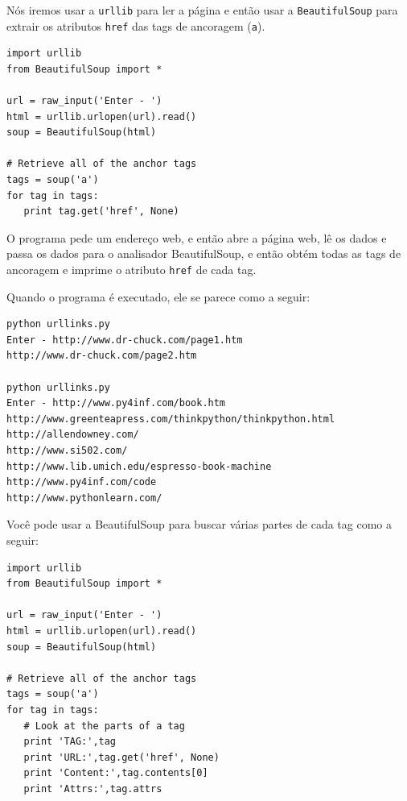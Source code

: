 Nós iremos usar a {\tt urllib} para ler a página e então usar a
{\tt BeautifulSoup} para extrair os atributos {\tt href} das tags de ancoragem
({\tt a}).

\beforeverb
\begin{verbatim}
import urllib
from BeautifulSoup import *

url = raw_input('Enter - ')
html = urllib.urlopen(url).read()
soup = BeautifulSoup(html)

# Retrieve all of the anchor tags
tags = soup('a')
for tag in tags:
   print tag.get('href', None)
\end{verbatim}
\afterverb

O programa pede um endereço web, e então abre a página web, lê os dados e
passa os dados para o analisador BeautifulSoup, e então obtém todas as tags
de ancoragem e imprime o atributo {\tt href} de cada tag.

Quando o programa é executado, ele se parece como a seguir:

\beforeverb
\begin{verbatim}
python urllinks.py 
Enter - http://www.dr-chuck.com/page1.htm
http://www.dr-chuck.com/page2.htm

python urllinks.py 
Enter - http://www.py4inf.com/book.htm
http://www.greenteapress.com/thinkpython/thinkpython.html
http://allendowney.com/
http://www.si502.com/
http://www.lib.umich.edu/espresso-book-machine
http://www.py4inf.com/code
http://www.pythonlearn.com/
\end{verbatim}
\afterverb

Você pode usar a BeautifulSoup para buscar várias partes de cada tag como a
seguir:

\beforeverb
\begin{verbatim}
import urllib
from BeautifulSoup import *

url = raw_input('Enter - ')
html = urllib.urlopen(url).read()
soup = BeautifulSoup(html)

# Retrieve all of the anchor tags
tags = soup('a')
for tag in tags:
   # Look at the parts of a tag
   print 'TAG:',tag
   print 'URL:',tag.get('href', None)
   print 'Content:',tag.contents[0]
   print 'Attrs:',tag.attrs
\end{verbatim}
\afterverb

